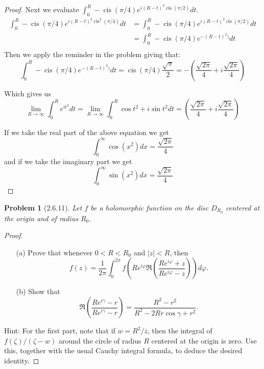 \documentclass[10pt]{article}
\newcommand{\sk}{\vskip 10mm}
\newcommand{\conj}[1]{\overline{#1}}
\DeclareMathOperator{\cis}{cis}
\theoremstyle{plain}
\newtheorem{problem}{Problem}
\theoremstyle{remark}
\begin{document}
\begin{proof}
  Next we evaluate $\int_0^R-\cis(\pi/4)e^{i(R-t)^2\cis(\pi/2)}dt$.
  \begin{align*}
    \int_0^R-\cis(\pi/4)e^{i(R-t)^2\cis^2(\pi/4)} dt &= \int_0^R-\cis(\pi/4)e^{i(R-t)^2\cis(\pi/2)}dt\\
                                              &= \int_0^R-\cis(\pi/4)e^{-(R-t)^2)}dt\\
  \end{align*}
  Then we apply the reminder in the problem giving that:
  \[
    \int_0^R-\cis(\pi/4)e^{-(R-t)^2)}dt = \cis(\pi/4)\frac{\sqrt{\pi}}{2}=-\left(\frac{\sqrt{2\pi}}{4}+i\frac{\sqrt{2\pi}}{4}\right)
  \]

  Which gives us
  \[
    \lim_{R\rightarrow\infty}\int_0^R e^{it^2}dt=\lim_{R\rightarrow\infty}\int_0^R\cos t^2+i\sin t^2 dt = \left(\frac{\sqrt{2\pi}}{4}+i\frac{\sqrt{2\pi}}{4}\right)
  \]

  If we take the real part of the above equation we get
  \[
    \int_0^\infty\cos(x^2)dx=\frac{\sqrt{2\pi}}{4}
  \]
  and if we take the imaginary part we get
  \[
    \int_0^\infty\sin(x^2)dx=\frac{\sqrt{2\pi}}{4}
  \]
\end{proof}

\sk

\begin{problem}[2.6.11]
  Let $f$ be a holomorphic function on the disc $D_{R_0}$ centered at the
  origin and of radius $R_0$.
\end{problem}

\begin{proof}
  \begin{itemize}
  \item[(a)] Prove that whenever $0<R<R_0$ and $|z|<R$, then
    \[
      f(z)=\frac{1}{2\pi}\int_0^{2\pi}f(Re^{i\varphi}\Re\left(\frac{Re^{i\varphi}+z}{Re^{i\varphi}-z}\right))d\varphi.
    \]
  \item[(b)] Show that
    \[
      \Re\left(\frac{Re^{i\gamma}-r}{Re^{i\gamma}-r}\right) = \frac{R^2-r^2}{R^2-2Rr\cos\gamma + r^2}.
    \]
  \end{itemize}
  Hint: For the first part, note that if $w=R^2/\conj{z}$, then the integral of
  $f(\zeta)/(\zeta-w)$ around the circle of radius $R$ centered at the origin is
  zero. Use this, together with the usual Cauchy integral formula, to deduce
  the desired identity.
\end{proof}

\end{document}
